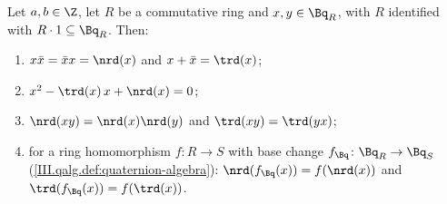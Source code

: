 Let $a,b\in\Z$, let $R$ be a commutative ring and $x,y\in\Bq_R$, with $R$ identified with $R\cdot1\subseteq\Bq_R$. Then:
\begin{enumerate}[label=(\alph*)]
\item $x\bar x=\bar x x=\nrd(x)$ and $x+\bar x=\trd(x)$;
\item $x^2-\trd(x)\,x+\nrd(x)=0$;
\item $\nrd(xy)=\nrd(x)\nrd(y)$ and $\trd(xy)=\trd(yx)$;
\item for a ring homomorphism $f\colon R\to S$ with base change $f_{\Bq}\colon\Bq_R\to\Bq_S$ (\cref{III.qalg.def:quaternion-algebra}):
  $\nrd(f_{\Bq}(x))=f(\nrd(x))$ and $\trd(f_{\Bq}(x))=f(\trd(x))$.
\end{enumerate}
